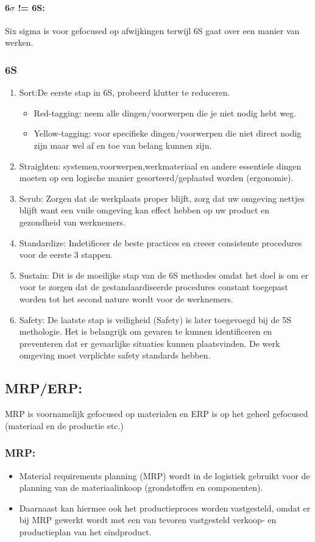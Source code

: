 \documentclass[12pt]{article}
\begin{document}
\paragraph{6$\sigma$ != 6S:}
Six sigma is voor gefocused op afwijkingen terwijl 6S gaat over een manier van werken.
\subsubsection{6S}
\begin{enumerate}
    \item Sort:De eerste stap in 6S, probeerd klutter te reduceren.\begin{itemize}
        \item Red-tagging: neem alle dingen/voorwerpen die je niet nodig hebt weg.
        \item Yellow-tagging: voor specifieke dingen/voorwerpen die niet direct nodig zijn maar wel af en toe van belang kunnen zijn.
    \end{itemize}
    \item Straighten: systemen,voorwerpen,werkmateriaal en andere essentiele dingen moeten op een logische manier gesorteerd/geplaatsd worden (ergonomie).
    \item Scrub: Zorgen dat de werkplaats proper blijft, zorg dat uw omgeving nettjes blijft want een vuile omgeving kan effect hebben op uw product en gezondheid van werknemers.
    \item Standardize: Indetificeer de beste practices en creeer consistente procedures voor de eerste 3 stappen.
    \item Sustain: Dit is de moeilijke stap van de 6S methodes omdat het doel is om er voor te zorgen dat de gestandaardiseerde procedures constant toegepast worden tot het second nature wordt voor de werknemers.
    \item Safety: De laatste stap is veiligheid (Safety) is later toegevoegd bij de 5S methologie. Het is belangrijk om gevaren te kunnen identificeren en preventeren dat er gevaarlijke situaties kunnen plaatsvinden. De werk omgeving moet verplichte safety standards hebben.
\end{enumerate}
\subsection{MRP/ERP:}
MRP is voornamelijk gefocused op materialen en ERP is op het geheel gefocused (materiaal en de productie etc.)
\subsubsection{MRP:}
\begin{itemize}
    \item Material requirements planning (MRP) wordt in de logistiek gebruikt voor de planning van de materiaalinkoop (grondstoffen en componenten).
    \item Daarnaast kan hiermee ook het productieproces worden vastgesteld, omdat er bij MRP gewerkt wordt met een van tevoren vastgesteld verkoop- en productieplan van het eindproduct.
\end{itemize}
\end{document}
